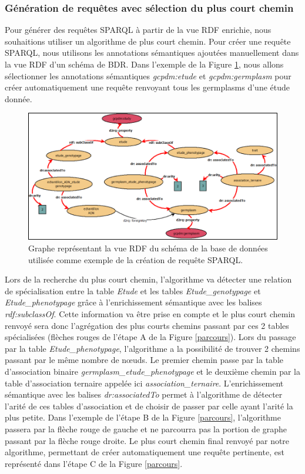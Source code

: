 \subsubsection*{Génération de requêtes avec sélection du plus court chemin}
Pour générer des requêtes SPARQL à partir de la vue RDF enrichie, nous souhaitions utiliser un algorithme de plus court chemin. 
Pour créer une requête SPARQL, nous utilisons les annotations sémantiques ajoutées manuellement dans la vue RDF d'un schéma de BDR. Dans l’exemple de la Figure \ref{graph}, nous allons sélectionner les annotations sémantiques \textit{gcpdm:etude} et \textit{gcpdm:germplasm} pour créer automatiquement une requête renvoyant tous les germplasms d'une étude donnée. 

\begin{figure}[!ht]
\begin{center}
	\includegraphics[width=1\textwidth]{Figures/biosemantic3.png}
\end{center}
\label{graph}
\caption{Graphe représentant la vue RDF du schéma de la base de données utilisée comme exemple de la création de requête SPARQL.}
\end{figure}

Lors de la recherche du plus court chemin, l'algorithme va détecter une relation de spécialisation entre la table \textit{Etude} et les tables \textit{Etude\_genotypage} et \textit{Etude\_phenotypage} grâce à l'enrichissement sémantique avec les balises \textit{rdf:subclassOf}. Cette information va être prise en compte et le plus court chemin renvoyé sera donc l'agrégation des plus courts chemins passant par ces 2 tables spécialisées (flèches rouges de l'étape A de la Figure \ref{parcours}). Lors du passage par la table \textit{Etude\_phenotypage}, l'algorithme a la possibilité de trouver 2 chemins passant par le même nombre de n\oe  uds. Le premier chemin passe par la table d'association binaire \textit{germplasm\_etude\_phenotypage} et le deuxième chemin par la table d'association ternaire appelée ici \textit{association\_ternaire}. L'enrichissement sémantique avec les balises \textit{dr:associatedTo} permet à l'algorithme de détecter l'arité de ces tables d'association et de choisir de passer par celle ayant l'arité la plus petite. Dans l'exemple de l'étape B de la Figure \ref{parcours}, l'algorithme passera par la flèche rouge de gauche et ne parcourra pas la portion de graphe passant par la flèche rouge droite. Le plus court chemin final renvoyé par notre algorithme, permettant de créer automatiquement une requête pertinente, est représenté dans l'étape C de la Figure \ref{parcours}.


